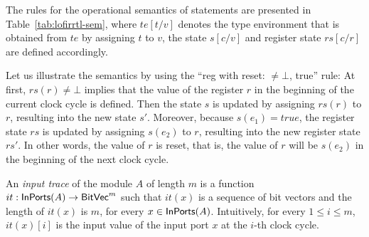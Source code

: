 The rules for the operational semantics of statements are presented in Table~\ref{tab:lofirrtl-sem}, where $te[t/v]$ denotes the type environment that is obtained from $te$ by assigning $t$ to $v$,
the state $s[c/v]$ and register state $rs[c/r]$ are defined accordingly.


Let us illustrate the semantics by using the ``reg with reset: $\neq \bot$, true'' rule: At first, $rs(r) \neq \bot$ implies that the value of the register $r$ in the beginning of the current clock cycle is defined. Then the state $s$ is updated by assigning $rs(r)$ to $r$, resulting into the new state $s'$. Moreover, because $s(e_1)=true$, the register state $rs$ is updated by assigning $s(e_2)$ to $r$, resulting into the new register state $rs'$. In other words, the value of $r$ is reset, that is, the value of $r$ will be $s(e_2)$ in the beginning of the next clock cycle.
%

An \emph{input trace} of the module $A$ of length $m$ is a function $it:{\sf InPorts}(A)\rightarrow{\sf BitVec}^m$ such that $it(x)$ is a sequence of bit vectors and the length of $it(x)$ is $m$, for every $x \in {\sf InPorts}(A)$.
Intuitively, for every $1\leq i\leq m$, $it(x)[i]$ is the input value of the input port $x$ at the $i$-th clock cycle.


